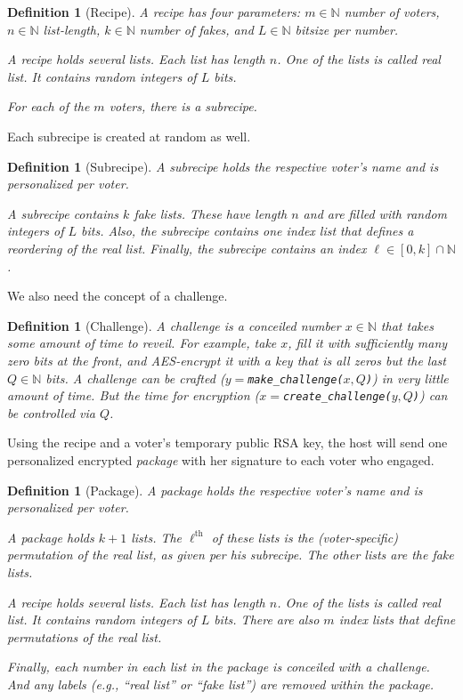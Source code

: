 \documentclass{article}
\newcommand{\N}{\mathbb{N}\xspace}
\newtheorem{defn}[thm]{Definition}
\theoremstyle{definition}
\begin{document}
	\begin{defn}[Recipe]
		A recipe has four parameters: $m \in \N$ number of voters, $n \in \N$ list-length, $k \in \N$ number of fakes, and $L \in \N$ bitsize per number.
		
		A recipe holds several lists. Each list has length $n$. One of the lists is called \emph{real list}. It contains random integers of $L$ bits. 
		
		For each of the $m$ voters, there is a subrecipe.
	\end{defn}
	Each subrecipe is created at random as well.
	
	\begin{defn}[Subrecipe]
		A subrecipe holds the respective voter's name and is personalized per voter.
		
		A subrecipe contains $k$ fake lists. These have length $n$ and are filled with random integers of $L$ bits. Also, the subrecipe contains one \emph{index list} that defines a reordering of the real list. Finally, the subrecipe contains an index $\ell \in [0,k] \cap \N$.
	\end{defn}
	
	We also need the concept of a challenge.
	\begin{defn}[Challenge]
		A challenge is a conceiled number $x \in\N$ that takes some amount of time to reveil. For example, take $x$, fill it with sufficiently many zero bits at the front, and AES-encrypt it with a key that is all zeros but the last $Q \in \N$ bits. A challenge can be crafted ($y=$\texttt{make\_challenge($x,Q$)}) in very little amount of time. But the time for encryption ($x=$\texttt{create\_challenge($y,Q$)}) can be controlled via $Q$.
	\end{defn}
	
	Using the recipe and a voter's temporary public RSA key, the host will send one personalized encrypted \emph{package} with her signature to each voter who engaged.
	
	\begin{defn}[Package]
		A package holds the respective voter's name and is personalized per voter.
		
		A package holds $k+1$ lists. The $\ell^\text{th}$ of these lists is the (voter-specific) permutation of the real list, as given per his subrecipe. The other lists are the fake lists.
				
		A recipe holds several lists. Each list has length $n$. One of the lists is called \emph{real list}. It contains random integers of $L$ bits. There are also $m$ \emph{index lists} that define permutations of the real list.
		
		Finally, each number in each list in the package is conceiled with a challenge. And any labels (e.g., ``real list'' or ``fake list'') are removed within the package.
	\end{defn}
	
\end{document}
